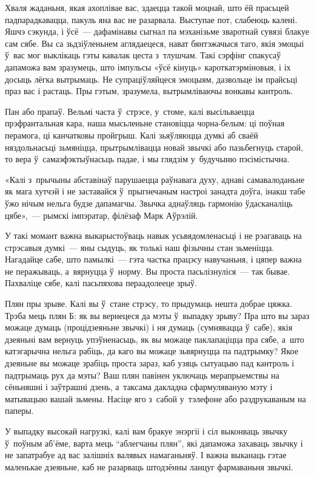 Хваля жаданьня, якая ахоплівае вас, здаецца такой моцнай, што ёй прасьцей падпарадкавацца, пакуль яна вас не разарвала. Выступае пот, слабеюць калені. Яшчэ сэкунда, і ўсё~--- дафамінавы сыгнал па мэханізьме зваротнай сувязі блакуе сам сябе. Вы са зьдзіўленьнем аглядаецеся, нават бянтэжачыся таго, якія эмоцыі ў~вас мог выклікаць гэты кавалак цеста з~тлушчам. Такі сэрфінг спакусаў дапаможа вам зразумець, што імпульсы «ўсё кінуць» кароткатэрміновыя, і іх досыць лёгка вытрымаць. Не супраціўляйцеся эмоцыям, дазвольце ім прайсьці праз вас і растаць. Пры гэтым, зразумела, вытрымліваючы вонкавы кантроль.

Пан або прапаў. Вельмі часта ў~стрэсе, у~стоме, калі высільваецца прэфрантальная кара, наша мысьленьне становіцца чорна-белым: ці поўная перамога, ці канчатковы пройгрыш. Калі зьяўляюцца думкі аб сваёй няздольнасьці зьмяніцца, прытрымлівацца новай звычкі або пазьбегнуць старой, то вера ў~самаэфэктыўнасьць падае, і мы глядзім у~будучыню пэсімістычна.

«Калі з~прычыны абставінаў парушаецца раўнавага духу, аднаві самавалоданьне як мага хутчэй і не заставайся ў~прыгнечаным настроі занадта доўга, інакш табе ўжо нічым нельга будзе дапамагчы. Звычка аднаўляць гармонію ўдасканаліць цябе»,~--- рымскі імпэратар, філёзаф Марк Аўрэлій.

У такі момант важна выкарыстоўваць навык усьвядомленасьці і не рэагаваць на стрэсавыя думкі~--- яны сыдуць, як толькі наш фізычны стан зьменіцца. Нагадайце сабе, што памылкі~--- гэта частка працэсу навучаньня, і цяпер важна не перажываць, а~вярнуцца ў~норму. Вы проста пасьлізнуліся~--- так бывае. Пахваліце сябе, калі пасьпяхова пераадолееце зрыў.

Плян пры зрыве. Калі вы ў~стане стрэсу, то прыдумаць нешта добрае цяжка. Трэба мець плян Б: як вы вернецеся да мэты ў~выпадку зрыву? Пра што вы зараз можаце думаць (процідзеяньне звычкі) і ня думаць (сумнявацца ў~сабе), якія дзеяньні вам вернуць упэўненасьць, як вы можаце паклапаціцца пра сябе, а~што катэгарычна нельга рабіць, да каго вы можаце зьвярнуцца па падтрымку? Якое дзеяньне вы можаце зрабіць проста зараз, каб узяць сытуацыю пад кантроль і падтрымаць рух да мэты? Ваш плян павінен уключаць мерапрыемствы на сёньняшні і заўтрашні дзень, а~таксама дакладна сфармуляваную мэту і матывацыю вашай зьмены. Насіце яго з~сабой у~тэлефоне або раздрукаваным на паперы.

У выпадку высокай нагрузкі, калі вам бракуе энэргіі і сіл выконваць звычку ў~поўным аб'ёме, варта мець ``аблегчаны плян'', які дапаможа захаваць звычку і не запатрабуе ад вас залішніх валявых намаганьняў. І важна выканаць гэтае маленькае дзеяньне, каб не разарваць штодзённы ланцуг фармаваньня звычкі.

